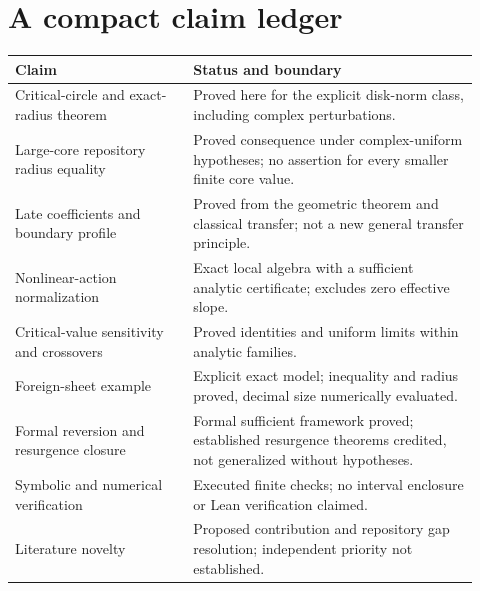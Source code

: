 \documentclass[11pt,a4paper]{article}
\numberwithin{equation}{section}
\theoremstyle{definition}
\theoremstyle{remark}
\begin{document}
\section{A compact claim ledger}
\label{app:ledger}
\begin{center}\small
\begin{tabular}{>{\raggedright\arraybackslash}p{0.35\linewidth}p{0.57\linewidth}}
\toprule
Claim & Status and boundary\\
\midrule
Critical-circle and exact-radius theorem & Proved here for the explicit disk-norm class, including complex perturbations.\\
Large-core repository radius equality & Proved consequence under complex-uniform hypotheses; no assertion for every smaller finite core value.\\
Late coefficients and boundary profile & Proved from the geometric theorem and classical transfer; not a new general transfer principle.\\
Nonlinear-action normalization & Exact local algebra with a sufficient analytic certificate; excludes zero effective slope.\\
Critical-value sensitivity and crossovers & Proved identities and uniform limits within analytic families.\\
Foreign-sheet example & Explicit exact model; inequality and radius proved, decimal size numerically evaluated.\\
Formal reversion and resurgence closure & Formal sufficient framework proved; established resurgence theorems credited, not generalized without hypotheses.\\
Symbolic and numerical verification & Executed finite checks; no interval enclosure or Lean verification claimed.\\
Literature novelty & Proposed contribution and repository gap resolution; independent priority not established.\\
\bottomrule
\end{tabular}
\end{center}
\end{document}
